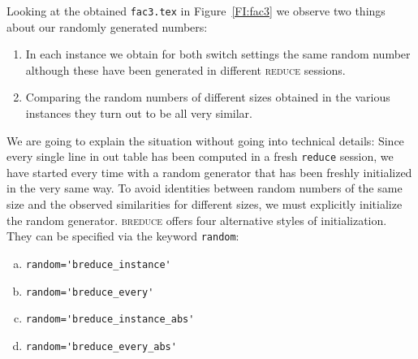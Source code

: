 \documentclass[a4paper]{article}
\begin{document}
Looking at the obtained \texttt{fac3.tex} in Figure~\ref{FI:fac3} we
observe two things about our randomly generated numbers:
\begin{enumerate}
\item In each instance we obtain for both switch settings the same
  random number although these have been generated in different
  \textsc{reduce} sessions.
\item Comparing the random numbers of different sizes obtained in the
  various instances they turn out to be all very similar.
\end{enumerate}
We are going to explain the situation without going into technical
details: Since every single line in out table has been computed in a
fresh \texttt{reduce} session, we have started every time with a
random generator that has been freshly initialized in the very same
way. To avoid identities between random numbers of the same size and
the observed similarities for different sizes, we must explicitly
initialize the random generator. \textsc{breduce} offers four
alternative styles of initialization. They can be specified via the
keyword \texttt{random}:
\begin{enumerate}[(a)]
\item \verb!random='breduce_instance'!
\item \verb!random='breduce_every'!
\item \verb!random='breduce_instance_abs'!
\item \verb!random='breduce_every_abs'!
\end{enumerate}
\end{document}
